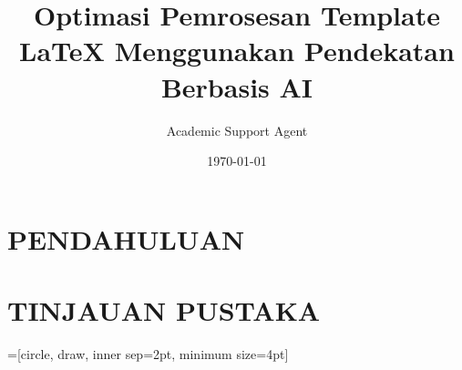 \documentclass{book}
\title{Optimasi Pemrosesan Template LaTeX Menggunakan Pendekatan Berbasis AI}
\author{Academic Support Agent}
\date{\today}
\begin{document}
\maketitle

\begin{abstract}

\end{abstract}

\chapter{PENDAHULUAN}


\chapter{TINJAUAN PUSTAKA}


\usepackage{amsmath}
\usepackage{amssymb}
\usepackage{amsthm}
\usepackage{graphicx}
\usepackage{latexsym}
\usepackage{color}
\usepackage{fancyhdr}
\usepackage{cite}
\usepackage{indentfirst}
\usepackage{tocloft}
\usepackage{multirow}
\usepackage{fontspec}

\usepackage{sectsty}   
\chapterfont{\centering}

\pagestyle{myheadings}
\setlength{\parindent}{0.8in}

\usepackage[top=1.5in,bottom=1in,left=1.5in,right=1in]{geometry}



\theoremstyle{plain}
\newtheorem{thm}{Theorem}[chapter]
\newtheorem{lem}[thm]{Lemma}
\newtheorem{cor}[thm]{Corollary}
\newtheorem{prop}[thm]{Proposition}
\newtheorem{rem}[thm]{Remark}
\newtheorem{ex}[thm]{Example}
\newtheorem{de}[thm]{Definition}
\renewcommand{\proof}{\textbf{Proof.}}

 \DeclareMathOperator{\Var}{Var}
\DeclareMathOperator{\Ima}{Im}

\usepackage{float}

\usepackage{graphics,graphicx}
\usepackage{calc}
\usepackage{tikz}
\usetikzlibrary{decorations.markings}
=[circle, draw, inner sep=2pt, minimum size=4pt]
\newcommand{\vertex}{\node[vertex]}
\end{document}
